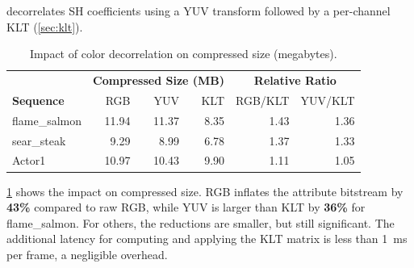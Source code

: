 %
\gsnfs{} decorrelates SH coefficients using a YUV transform followed by a per-channel KLT (\cref{sec:klt}).
%
%
\begin{table}[t]
  \centering
  \begin{tabular}{l|rrr|rr}
    \hline
    & \multicolumn{3}{c|}{\textbf{Compressed Size (MB)}} & \multicolumn{2}{c}{\textbf{Relative Ratio}} \\
    \textbf{Sequence} & RGB & YUV & KLT & RGB/KLT & YUV/KLT \\
    \hline\hline
    flame\_salmon  & 11.94 & 11.37  & 8.35  & 1.43  & 1.36  \\
    sear\_steak    & 9.29 & 8.99  & 6.78    & 1.37  & 1.33  \\
    Actor1         & 10.97 & 10.43  & 9.90  & 1.11  & 1.05  \\
    \hline
  \end{tabular}
  \caption{Impact of color decorrelation on compressed size (megabytes).}
  \label{tab:ablation-klt}
\end{table}
%
\cref{tab:ablation-klt} shows the impact on compressed size.
%
RGB inflates the attribute bitstream by \textbf{43\%} compared to raw RGB, while YUV is larger than KLT by \textbf{36\%} for flame\_salmon.
%
For others, the reductions are smaller, but still significant.
%
The additional latency for computing and applying the KLT matrix is less than 1~ms per frame, a negligible overhead.
%

